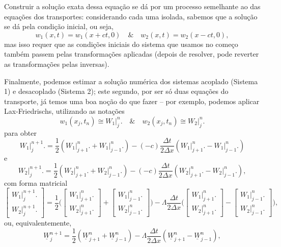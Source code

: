 \documentclass[../differential_methods.tex]{subfiles}
\begin{document}
Construir a solução exata dessa equação se dá por um processo semelhante ao das equações dos transportes: considerando cada uma isolada, sabemos que a solução se dá pela condição inicial, ou seja,
\[
	w_1(x, t) = w_1(x+ct, 0) \quad\&\quad w_2(x, t) = w_2(x- ct, 0),
\]
mas isso requer que as condições iniciais do sistema que usamos no começo também passem pelas transformações aplicadas (depois de resolver, pode reverter as transformações pelas inversas).

Finalmente, podemos estimar a solução numérica dos sistemas acoplado (Sistema 1) e desacoplado (Sistema 2); este segundo, por ser só duas equações do transporte, já temos uma boa noção do que fazer -- por exemplo, podemos aplicar Lax-Friedrischs, utilizando as notações
\[
	w_1(x_{j}, t_{n})\cong W_{1}\biggl|_{j}^{n}\biggr. \quad\& \quad w_2(x_{j}, t_{n})\cong W_{2}\biggl|_{j}^{n}\biggr.
\]
para obter
\[
	W_{1}\biggl|_{j}^{n+1}\biggr. = \frac{1}{2}(W_{1} \biggl|_{j+1}^{n}\biggr. + W_1 \biggl|_{j-1}^{n}\biggr.) - (-c)\frac{\Delta t}{2\Delta x}(W_1 \biggl|_{j+1}^{n}\biggr. - W_1 \biggl|_{j-1}^{n}\biggr.)
\]
e
\[
	W_{2}\biggl|_{j}^{n+1}\biggr. = \frac{1}{2}(W_{2} \biggl|_{j+1}^{n}\biggr. + W_2 \biggl|_{j-1}^{n}\biggr.) - (-c)\frac{\Delta t}{2\Delta x}(W_2 \biggl|_{j+1}^{n}\biggr. - W_2 \biggl|_{j-1}^{n}\biggr.),
\]
com forma matricial
\[
	\begin{bmatrix}
		W_1 \bigl|_{j}^{n+1}\bigr. \\
		W_2 \bigl|_{j}^{n+1}\bigr.
	\end{bmatrix} = \frac{1}{2}\biggl(\begin{bmatrix}
			W_1 \bigl|_{j+1}^{n}\bigr. \\
			W_2 \bigl|_{j+1}^{n}\bigr.
		\end{bmatrix}+\begin{bmatrix}
			W_1 \bigl|_{j-1}^{n}\bigr. \\
			W_2 \bigl|_{j-1}^{n}\bigr.
		\end{bmatrix} \biggr) - \Lambda \frac{\Delta t}{2\Delta x}\biggl(\begin{bmatrix}
			W_1 \bigl|_{j+1}^{n}\bigr. \\
			W_2 \bigl|_{j+1}^{n}\bigr.
		\end{bmatrix} - \begin{bmatrix}
			W_1 \bigl|_{j-1}^{n}\bigr. \\
			W_2 \bigl|_{j-1}^{n}\bigr.
		\end{bmatrix}\biggr),
\]
ou, equivalentemente,
\[
	\underline{W}_{j}^{n+1} = \frac{1}{2}(\underline{W}_{j+1}^{n}+\underline{W}_{j-1}^{n})-\Lambda \frac{\Delta t}{2\Delta x}(\underline{W}_{j+1}^{n}-\underline{W}_{j-1}^{n}),
\]
\end{document}

